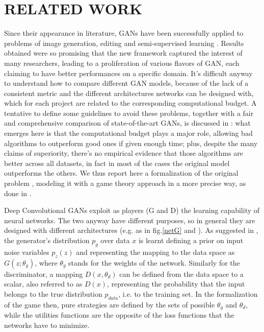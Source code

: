 \section{RELATED WORK} \label{relatedwork}

Since their appearance in literature, GANs have been successfully applied to problems of image generation, editing and semi-supervised learning \cite{DBLP:journals/corr/RadfordMC15} \cite{DBLP:journals/corr/ZhangXLZHWM16}.
Results obtained were so promising that the new framework captured the interest of many researchers, leading to a proliferation of various flavors of GAN, each claiming to have better performances on a specific domain.
It's difficult anyway to understand how to compare different GAN models, because of the lack of a consistent metric and the different architectures networks can be designed with, which for each project are related to the corresponding computational budget.
A tentative to define some guidelines to avoid these problems, together with a fair and comprehensive comparison of state-of-the-art GANs, is discussed in \cite{46506}: what emerges here is that the computational budget plays a major role, allowing bad algorithms to outperform good ones if given enough time; plus, despite the many claims of superiority, there's no empirical evidence that those algorithms are better across all datasets, in fact in most of the cases the original model outperforms the others.
We thus report here a formalization of the original problem \cite{NIPS2014_5423}, modeling it with a game theory approach in a more precise way, as done in \cite{2017arXiv171200679O}.

Deep Convolutional GANs exploit as players (G and D) the learning capability of neural networks. The two anyway have different purposes, so in general they are designed with different architectures (e.g. as in fig.\ref{netG} and \label{netD}).
As suggested in \cite{NIPS2014_5423}, the generator's distribution $p_g$ over data $x$ is learnt defining a prior on input noise variables $p_z(z)$ and representing the mapping to the data space as $G(z;\theta_g)$, where $\theta_g$ stands for the weights of the network.
Similarly for the discriminator, a mapping $D(x,\theta_d)$ can be defined from the data space to a scalar, also referred to as $D(x)$, representing the probability that the input belongs to the true distribution $p_{data}$, i.e. to the training set.
In the formalization of the game then, pure strategies are defined by the sets of possible $\theta_g$ and $\theta_d$, while the utilities functions are the opposite of the loss functions that the networks have to minimize.

